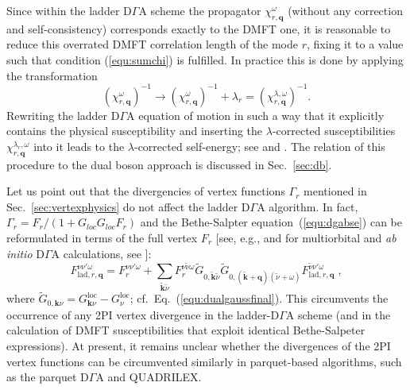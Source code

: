 \documentclass[rmp,aps,reprint,amsmath,amssymb,superscriptaddress,showpacs,nofootinbib]{revtex4-1}
\begin{document}
Since within the ladder D$\Gamma$A scheme the propagator $\chi_{r,\mathbf{q}}^{\omega}$ (without any correction and self-consistency) corresponds exactly to the DMFT one, it is reasonable to reduce this overrated DMFT correlation length of the mode $r$, fixing it to a value such that condition (\ref{equ:sumchi}) is fulfilled. In practice this is done by applying the transformation 
\begin{equation}
 \label{equ:lambdachi}
 \left(\chi_{r,\mathbf{q}}^{\omega}\right)^{-1}\rightarrow\left(\chi_{r,\mathbf{q}}^{\omega}\right)^{-1}+\lambda_r=(\chi_{r,\mathbf{q}}^{\lambda,\omega})^{-1}.
\end{equation}
Rewriting the ladder D$\Gamma$A equation of motion in such a way that it explicitly contains the physical susceptibility and inserting  the $\lambda$-corrected susceptibilities $\chi_{r,\mathbf{q}}^{\lambda_r,\omega}$ into it leads to the $\lambda$-corrected self-energy; see  and . The relation of this procedure to the dual boson approach is discussed in Sec.~\ref{sec:db}.

Let us point out  that the  divergencies of vertex functions $\Gamma_{r}$ mentioned in  Sec.~\ref{sec:vertexphysics}  do not affect  the ladder  D$\Gamma$A algorithm. In fact, $\Gamma_{r} = F_r/(1 + G_{loc}G_{loc}F_r)$ and the Bethe-Salpter equation~(\ref{equ:dgabse})  can be reformulated in terms of the full vertex $F_r$  [see, e.g.,  and for  multiorbital and {\em ab initio}   D$\Gamma$A calculations, see ]:
\begin{equation}
\label{equ:ladderdganodiv} 
 F_{\text{lad},r,\mathbf{q}}^{\nu\nu'\omega} = F_r^{\nu\nu'\omega}+\!\sum_{\tilde{\mathbf{k}}\tilde{\nu}}F_{r}^{\nu\tilde{\nu}\omega}
 \tilde{G}_{0,\tilde{\mathbf{k}}\tilde{\nu}}\tilde{G}_{0,(\tilde{\mathbf{k}}+\!\mathbf{q})(\tilde{\nu}\!+\!\omega)}F_{\text{lad},r,\mathbf{q}}^{\tilde{\nu}\nu'\omega} \; ,
\end{equation}
where $\tilde{G}_{0,\mathbf{k}\nu}= G^{\text{loc}}_{\mathbf{k}\nu}-  G^{\text{loc}}_{\nu}$; cf.\ Eq.~(\ref{equ:dualgaussfinal}). This circumvents the occurrence of any 2PI vertex divergence in the ladder-D$\Gamma$A scheme (and in the calculation of DMFT susceptibilities that exploit identical Bethe-Salpeter expressions). At present,  it remains unclear whether the divergences of the 2PI vertex functions  can be circumvented similarly in parquet-based algorithms, such as the parquet D$\Gamma$A and QUADRILEX. 
\end{document}
